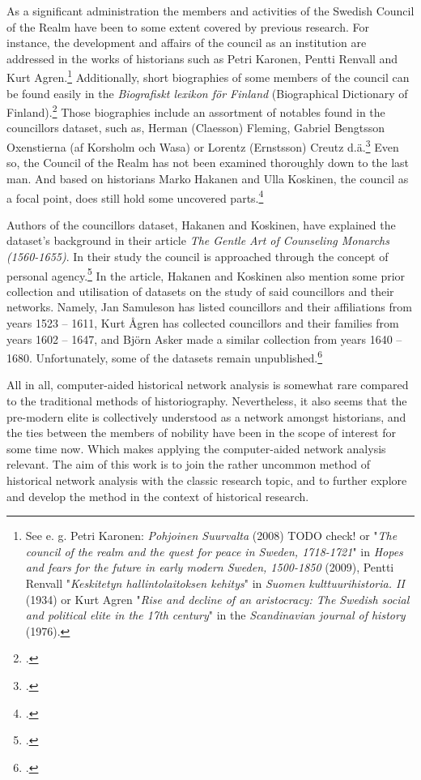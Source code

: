 \documentclass[a4paper,12pt]{article}
\begin{document}
\begin{onehalfspace}
As a significant administration the members and activities of the Swedish Council of the Realm have been to some extent covered by previous research. For instance, the development and affairs of the council as an institution are addressed in the works of historians such as Petri Karonen, Pentti Renvall and Kurt Agren.\footnote{See e. g. Petri Karonen: \textit{Pohjoinen Suurvalta} (2008) TODO check! or "\textit{The council of the realm and the quest for peace in Sweden, 1718-1721}" in \textit{Hopes and fears for the future in early modern Sweden, 1500-1850} (2009), Pentti Renvall "\textit{Keskitetyn hallintolaitoksen kehitys}" in \textit{Suomen kulttuurihistoria. II} (1934) or Kurt Agren "\textit{Rise and decline of an aristocracy: The Swedish social and political elite in the 17th century}" in the \textit{Scandinavian journal of history} (1976).} Additionally, short biographies of some members of the council can be found easily in the \textit{Biografiskt lexikon för Finland} (Biographical Dictionary of Finland).\footcite{blf} Those biographies include an assortment of notables found in the councillors dataset, such as, Herman (Claesson) Fleming, Gabriel Bengtsson Oxenstierna (af Korsholm och Wasa) or Lorentz (Ernstsson) Creutz d.ä.\footcite{blf-list} Even so, the Council of the Realm has not been examined thoroughly down to the last man. And based on historians Marko Hakanen and Ulla Koskinen, the council as a focal point, does still hold some uncovered parts.\footcite[p. 47-48.]{HakanenAKoskinen2017} 

Authors of the councillors dataset, Hakanen and Koskinen, have explained the dataset's background in their article \textit{The Gentle Art of Counseling Monarchs (1560-1655)}. In their study the council is approached through the concept of personal agency.\footcite{HakanenAKoskinen2017} In the article, Hakanen and Koskinen also mention some prior collection and utilisation of datasets on the study of said councillors and their networks. Namely, Jan Samuleson has listed councillors and their affiliations from years 1523 – 1611, Kurt Ågren has collected councillors and their families from years 1602 – 1647, and Björn Asker made a similar collection from years 1640 – 1680. Unfortunately, some of the datasets remain unpublished.\footcite[p. 48, 67 (cite 4).]{HakanenAKoskinen2017} 

All in all, computer-aided historical network analysis is somewhat rare compared to the traditional methods of historiography. Nevertheless, it also seems that the pre-modern elite is collectively understood as a network amongst historians, and the ties between the members of nobility have been in the scope of interest for some time now. Which makes applying the computer-aided network analysis relevant. The aim of this work is to join the rather uncommon method of historical network analysis with the classic research topic, and to further explore and develop the method in the context of historical research.


\end{onehalfspace}
\end{document}
